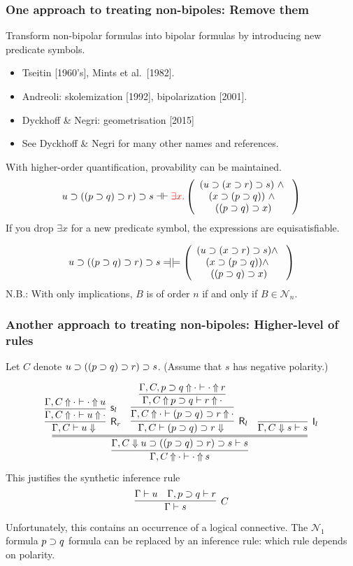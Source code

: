 \documentclass[9pt]{beamer}
\begin{document}
\begin{frame}
\frametitle{One approach to treating non-bipoles: Remove them}

Transform non-bipolar formulas into bipolar formulas by introducing
new predicate symbols.

\begin{itemize}
\item Tseitin [1960's], Mints et al.~[1982].
\item Andreoli: skolemization [1992], bipolarization [2001].
\item Dyckhoff \& Negri: geometrisation [2015]
\item See Dyckhoff \& Negri for many other names and references.
\end{itemize}

\vfill\pause
With higher-order quantification, provability can be maintained.
\[
  u\supset ((p\supset q)\supset r) \supset s \dashv\vdash {\color{red}\exists x. }
\left(\begin{array}{c}
    (u\supset(x\supset r) \supset s)~\wedge~\\
    (x\supset (p\supset q))~\wedge~\\
    ((p\supset q)\supset x)
\end{array}
\right)
\]
\pause
If you drop $\exists x$ for a new predicate symbol, the expressions
are equisatisfiable.

\newcommand{\sledom}{\Relbar\joinrel\mathrel{|}}

\[
  u\impl ((p\impl q)\impl r) \impl s \sledom \models
\left(\begin{array}{c}
    (u\impl (x\impl r) \impl s) \wedge~\\
    (x\impl (p\impl q))  \wedge~\\
    ((p\impl q)\impl x)
\end{array}
\right)
\]
\vfill
N.B.: With only implications, $B$ is of order $n$ if and only if $B\in\mathcal{N}_n$.
\vfill
\end{frame}

\begin{frame}
\frametitle{Another approach to treating non-bipoles: Higher-level of rules}

Let $C$ denote $u\supset ((p\supset q)\supset r) \supset s$.  (Assume that
$s$ has negative polarity.)

\[
  \infer{\jUnf{\Gamma, C}{\cdot}{\cdot}{s}}{
  \infer={\jLf{\Gamma, C}{u\impl ((p\impl q)\impl r) \impl s}{s}}{
    \infer[\krelease_r]{\jRf{\Gamma,C}{u}}{
       \infer[\kstore_l]{\jUnf{\Gamma,C}{\cdot}{u}{\cdot}}
                        {\jUnf{\Gamma,C}{\cdot}{\cdot}{u}}}
& 
  \infer[\krelease_l]{\jRf{\Gamma,C}{(p\impl q)\impl r}}{
  \infer{\jUnf{\Gamma,C}{\cdot}{(p\impl q)\impl r}{\cdot}}{
  \infer{\jUnf{\Gamma,C}{p\impl q}{r}{\cdot}}{
\jUnf{\Gamma,C,p\impl q}{\cdot}{\cdot}{r}
}}}
& 
    \infer[\kinit_l]{\jLf{\Gamma,C}{s}{s}}{}
}}
\]
This justifies the synthetic inference rule
\[
  \infer[C]{\Gamma\seq s}{ \Gamma\seq u & \Gamma,p\impl q \seq r}
\]
Unfortunately, this contains an occurrence of a logical connective.
\vfill
The $\mathcal{N}_1$ formula $p\supset q$ formula can be
replaced by an inference rule: which rule depends on polarity.
\vfill
\end{frame}
\end{document}
